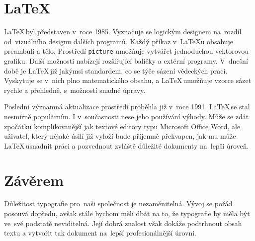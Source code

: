 \documentclass[a4paper, 11pt]{article}
\begin{document}
\section{\LaTeX}
\LaTeX\,byl představen v~roce 1985. Vyznačuje se logickým designem na~rozdíl od~vizuálního designu dalších programů. \cite{Lamport:Latex} Každý příkaz v~\LaTeX{u} obsahuje preambuli a tělo. Prostředí \verb|picture| umožňuje vytvářet jednoduchou vektorovou grafiku. Další možnosti nabízejí rozšiřující balíčky a extérní programy. \cite{Bunka:Moznosti_grafiky} V~dnešní době je \LaTeX\,již jakýmsi standardem, co se týče sázení vědeckých prací. Vyskytuje se v~nich plno matematického obsahu, \cite{TeX_conf:Proc} a \LaTeX\,umožňuje vzorce sázet rychle a přehledně, s~možností snadné úpravy.

Poslední významná aktualizace prostředí proběhla již v~roce 1991. \LaTeX\,se stal nesmírně populárním. \cite{Kopka:Latex_pruvodce}I v~současnosti nese jeho používání výhody. Může se zdát zpočátku komplikovanější jak textové editory typu Microsoft Office Word, ale uživatel, který nějaké úsilí již vyloží bude příjemně překvapen, jak mu může \LaTeX\,usnadnit práci a pozvednout zvláště důležité dokumenty na~lepší úroveň.

\section{Závěrem}
Důležitost typografie pro~naši společnost je nezaměnitelná. Vývoj se pořád posouvá dopředu, avšak stále bychom měli dbát na to, že typografie by měla být ve~své podstatě neviditelná. Její dobrá znalost však dokáže podtrhnout obsah textu a vytvořit tak dokument na~lepší profesionálnější úrovni.

\newpage

\end{document}
